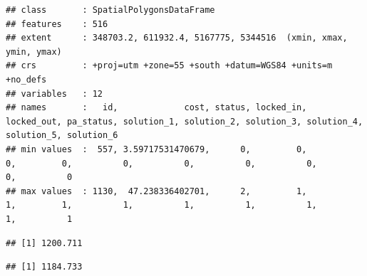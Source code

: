 \documentclass[
  12pt,
]{book}
\newenvironment{Shaded}{\begin{snugshade}}{\end{snugshade}}
\newcommand{\CommentTok}[1]{\textcolor[rgb]{0.56,0.35,0.01}{\textit{#1}}}
\newcommand{\FunctionTok}[1]{\textcolor[rgb]{0.00,0.00,0.00}{#1}}
\newcommand{\NormalTok}[1]{#1}
\newcommand{\SpecialCharTok}[1]{\textcolor[rgb]{0.00,0.00,0.00}{#1}}
\begin{document}
\begin{verbatim}
## class       : SpatialPolygonsDataFrame 
## features    : 516 
## extent      : 348703.2, 611932.4, 5167775, 5344516  (xmin, xmax, ymin, ymax)
## crs         : +proj=utm +zone=55 +south +datum=WGS84 +units=m +no_defs 
## variables   : 12
## names       :   id,             cost, status, locked_in, locked_out, pa_status, solution_1, solution_2, solution_3, solution_4, solution_5, solution_6 
## min values  :  557, 3.59717531470679,      0,         0,          0,         0,          0,          0,          0,          0,          0,          0 
## max values  : 1130,  47.238336402701,      2,         1,          1,         1,          1,          1,          1,          1,          1,          1
\end{verbatim}

\begin{Shaded}
\end{Shaded}

\begin{verbatim}
## [1] 1200.711
\end{verbatim}

\begin{Shaded}
\end{Shaded}

\begin{verbatim}
## [1] 1184.733
\end{verbatim}

\begin{Shaded}
\end{Shaded}
\end{document}
